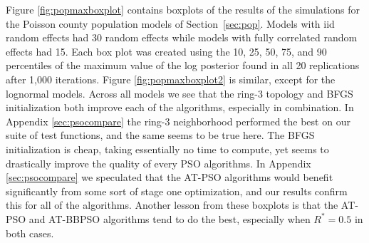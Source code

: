 \documentclass[12pt]{article}
\begin{document}
Figure \ref{fig:popmaxboxplot} contains boxplots of the results of the simulations for the Poisson county population models of Section~\ref{sec:pop}. Models with iid random effects had 30 random effects while models with fully correlated random effects had 15. Each box plot was created using the 10, 25, 50, 75, and 90 percentiles of the maximum value of the log posterior found in all 20 replications after 1,000 iterations. Figure \ref{fig:popmaxboxplot2} is similar, except for the lognormal models. Across all models we see that the ring-3 topology and BFGS initialization both improve each of the algorithms, especially in combination. In Appendix \ref{sec:psocompare} the ring-3 neighborhood performed the best on our suite of test functions, and the same seems to be true here. The BFGS initialization is cheap, taking essentially no time to compute, yet seems to drastically improve the quality of every PSO algorithms. In Appendix \ref{sec:psocompare} we speculated that the AT-PSO algorithms would benefit significantly from some sort of stage one optimization, and our results confirm this for all of the algorithms. Another lesson from these boxplots is that the AT-PSO and AT-BBPSO algorithms tend to do the best, especially when $R^*=0.5$ in both cases. 
\end{document}
